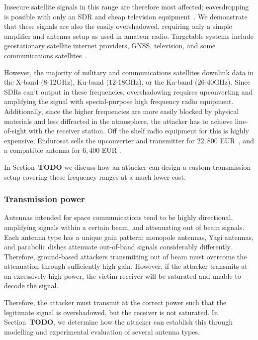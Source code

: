 Insecure satellite signals in this range are therefore most affected; eavesdropping is possible with only an SDR and cheap television equipment~\cite{pavur2020tale}.
We demonstrate that these signals are also the easily overshadowed, requiring only a simple amplifier and antenna setup as used in amateur radio.
Targetable systems include geostationary satellite internet providers, GNSS, television, and some communications satellites~\cite{esa_satellite_bands}.

However, the majority of military and communications satellites downlink data in the X-band (8-12GHz), Ku-band (12-18GHz), or the Ka-band (26-40GHz).
Since SDRs can't output in these frequencies, overshadowing requires upconverting and amplifying the signal with special-purpose high frequency radio equipment.
Additionally, since the higher frequencies are more easily blocked by physical materials and less diffracted in the atmosphere, the attacker has to achieve line-of-sight with the receiver station.
Off the shelf radio equipment for this is highly expensive; Endurosat sells the upconverter and transmitter for $22,800$ EUR~\cite{endurosat:xbandtransmitter}, and a compatible antenna for $6,400$ EUR \cite{endurosat:xbandantenna}.

In Section~\textbf{TODO} we discuss how an attacker can design a custom transmission setup covering these frequency ranges at a much lower cost.

\subsubsection{Transmission power}

Antennas intended for space communications tend to be highly directional, amplifying signals within a certain beam, and attenuating out of beam signals.
Each antenna type has a unique gain pattern; monopole antennas, Yagi antennas, and parabolic dishes attenuate out-of-band signals considerably differently.
Therefore, ground-based attackers transmitting out of beam must overcome the attenuation through sufficiently high gain.
However, if the attacker transmits at an excessively high power, the victim receiver will be saturated and unable to decode the signal.

Therefore, the attacker must transmit at the correct power such that the legitimate signal is overshadowed, but the receiver is not saturated.
In Section~\textbf{TODO}, we determine how the attacker can establish this through modelling and experimental evaluation of several antenna types.

